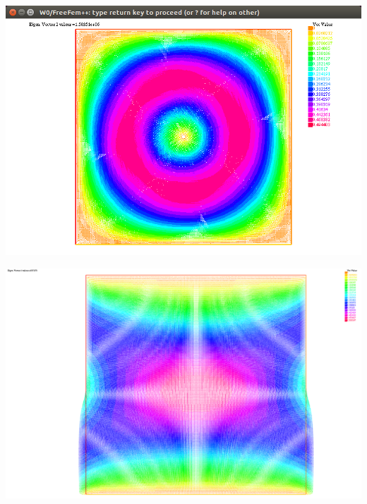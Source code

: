 \documentclass[french]{beamer}
\begin{document}
\begin{frame}
  \begin{center}
    \includegraphics[scale=0.4]{images/WF_p3d.png}
  \end{center}
\end{frame}

\begin{frame}
  \begin{center}
    \includegraphics[scale=0.19]{images/WF_p1n.png}
  \end{center}
\end{frame}
\end{document}
